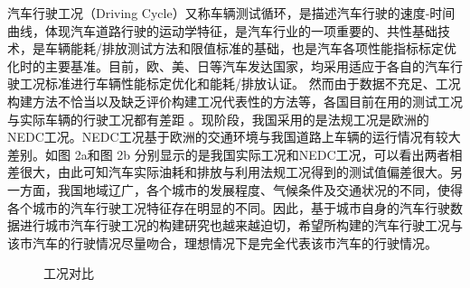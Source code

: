 \documentclass[bwprint]{gmcmthesis}
\begin{document}
汽车行驶工况（Driving Cycle）又称车辆测试循环，是描述汽车行驶的速度-时间曲线，体现汽车道路行驶的运动学特征，是汽车行业的一项重要的、共性基础技术，是车辆能耗/排放测试方法和限值标准的基础，也是汽车各项性能指标标定优化时的主要基准。目前，欧、美、日等汽车发达国家，均采用适应于各自的汽车行驶工况标准进行车辆性能标定优化和能耗/排放认证。
然而由于数据不充足、工况构建方法不恰当以及缺乏评价构建工况代表性的方法等，各国目前在用的测试工况与实际车辆的行驶工况都有差距 \cite{c1}。现阶段，我国采用的是法规工况是欧洲的NEDC工况。NEDC工况基于欧洲的交通环境与我国道路上车辆的运行情况有较大差别。如图 2a和图 2b 分别显示的是我国实际工况和NEDC工况，可以看出两者相差很大，由此可知汽车实际油耗和排放与利用法规工况得到的测试值偏差很大\cite{c2}。另一方面，我国地域辽广，各个城市的发展程度、气候条件及交通状况的不同，使得各个城市的汽车行驶工况特征存在明显的不同。因此，基于城市自身的汽车行驶数据进行城市汽车行驶工况的构建研究也越来越迫切，希望所构建的汽车行驶工况与该市汽车的行驶情况尽量吻合，理想情况下是完全代表该市汽车的行驶情况。
\begin{figure}[h] %
\centering
{}
\caption{工况对比}
\label{f1}
\end{figure}
\end{document}
